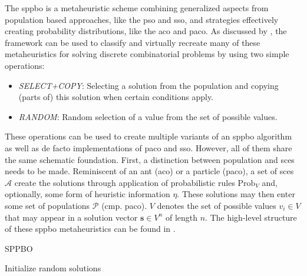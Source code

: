 The \gls{sppbo} is a metaheuristic scheme combining generalized aspects from population based approaches, like the \gls{pso} and \gls{sso}, and strategies effectively creating probability distributions, like the \gls{aco} and \gls{paco}. As discussed by \citet{lin2015simple}, the framework can be used to classify and virtually recreate many of these metaheuristics for solving discrete combinatorial problems by using two simple operations: 
\begin{itemize}
	\item \textit{SELECT+COPY}: Selecting a solution from the population and copying (parts of) this solution when certain conditions apply.
	\item \textit{RANDOM}: Random selection of a value from the set of possible values.
\end{itemize}
These operations can be used to create multiple variants of an \gls{sppbo} algorithm as well as de facto implementations of \gls{paco} and \gls{sso}. However, all of them share the same schematic foundation. First, a distinction between population and \glspl{sce} needs to be made. Reminiscent of an ant (\gls{aco}) or a particle (\gls{paco}),  a set of \glspl{sce} $\mathcal{A}$ create the solutions through application of probabilistic rules $\text{Prob}_V$ and, optionally, some form of heuristic information $\eta$. These solutions may then enter some set of populations $\mathcal{P}$ (cmp. \gls{paco}). $V$ denotes the set of possible values $v_i \in V$ that may appear in a solution vector $\textbf{s} \in V^n$ of length $n$. 
The high-level structure of these \gls{sppbo} metaheuristics can be found in .

\begin{algorithm}
	\caption{SPPBO}
	\label{alg:sppbo}
	\begin{algorithmic}
		\State Initialize random solutions
		\Repeat
			\State {}
		\EndFor
			\State {}
		\EndFor
	\end{algorithmic}
\end{algorithm}

